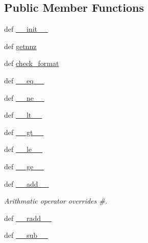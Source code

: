 \subsection*{Public Member Functions}
\begin{DoxyCompactItemize}
\item 
def \hyperlink{classscipy_1_1sparse_1_1compressed_1_1__cs__matrix_ab8e53a4722cd7ce6ef51c8d30c5f0a68}{\+\_\+\+\_\+init\+\_\+\+\_\+}
\item 
def \hyperlink{classscipy_1_1sparse_1_1compressed_1_1__cs__matrix_a2484505df82345e384ac4cb664ecee38}{getnnz}
\item 
def \hyperlink{classscipy_1_1sparse_1_1compressed_1_1__cs__matrix_a352ec43b94926ae8648ce80d795ca603}{check\+\_\+format}
\item 
def \hyperlink{classscipy_1_1sparse_1_1compressed_1_1__cs__matrix_ab7ad3597688c6a9020ff69389e019978}{\+\_\+\+\_\+eq\+\_\+\+\_\+}
\item 
def \hyperlink{classscipy_1_1sparse_1_1compressed_1_1__cs__matrix_ac94eed917474ff8989c42bd7235b30e9}{\+\_\+\+\_\+ne\+\_\+\+\_\+}
\item 
def \hyperlink{classscipy_1_1sparse_1_1compressed_1_1__cs__matrix_a23b2a970908d7bed431b7ea29a482ae0}{\+\_\+\+\_\+lt\+\_\+\+\_\+}
\item 
def \hyperlink{classscipy_1_1sparse_1_1compressed_1_1__cs__matrix_a75c89c68161ba2ec2038d241ec52ea21}{\+\_\+\+\_\+gt\+\_\+\+\_\+}
\item 
def \hyperlink{classscipy_1_1sparse_1_1compressed_1_1__cs__matrix_ab0400dd0662289655f0bc368238e4a3e}{\+\_\+\+\_\+le\+\_\+\+\_\+}
\item 
def \hyperlink{classscipy_1_1sparse_1_1compressed_1_1__cs__matrix_ab837e24d5ea32f738685db8d3d5c6248}{\+\_\+\+\_\+ge\+\_\+\+\_\+}
\item 
def \hyperlink{classscipy_1_1sparse_1_1compressed_1_1__cs__matrix_a6241574aee6b77de51c86c2f90cb9374}{\+\_\+\+\_\+add\+\_\+\+\_\+}
\begin{DoxyCompactList}\small\item\em Arithmatic operator overrides \#. \end{DoxyCompactList}\item 
def \hyperlink{classscipy_1_1sparse_1_1compressed_1_1__cs__matrix_a21fc61b73a871d7167298c008412b0e5}{\+\_\+\+\_\+radd\+\_\+\+\_\+}
\item 
def \hyperlink{classscipy_1_1sparse_1_1compressed_1_1__cs__matrix_a4689ed50fc713bad7b28de7923186c8b}{\+\_\+\+\_\+sub\+\_\+\+\_\+}
\item 

\end{DoxyCompactItemize}
